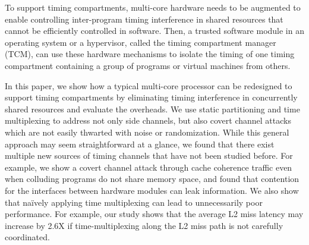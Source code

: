 
To support timing compartments, multi-core hardware needs to be augmented 
to enable controlling inter-program timing interference in shared 
resources that cannot be efficiently controlled in software.
Then, a trusted software module in an operating system or a hypervisor, called 
the timing compartment manager (TCM), can use these hardware mechanisms to
isolate the timing of one timing compartment containing a group of programs or 
virtual machines from others.

In this paper, we show how a typical multi-core processor can be redesigned to
support timing compartments by eliminating timing interference in concurrently
shared resources 
and evaluate the overheads.
We use static partitioning and time multiplexing to address not only 
side channels, but also covert channel attacks which are not easily thwarted with 
noise or randomization. 
While this general approach may seem straightforward at a glance, we found that
there exist multiple new sources of timing channels that have not been studied before.
For example, we show a covert channel attack through cache coherence traffic
even when colluding programs do not share memory space, and found that
contention for the interfaces between hardware 
modules can leak information.
We also show that 
naïvely applying time multiplexing can lead to unnecessarily poor performance. 
For example, our study shows that the average L2 miss latency may increase by
2.6X if time-multiplexing along the L2 miss path is not carefully coordinated.


